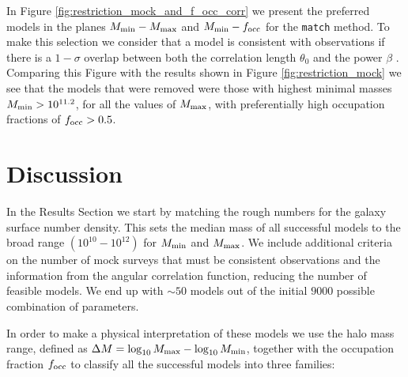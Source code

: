 \documentclass[usenatbib]{mn2e}
\newcommand{\hMsun}{{\ifmmode{h^{-1}{\rm
        {M_{\odot}}}}\else{$h^{-1}{\rm{M_{\odot}}}$}\fi}}
\begin{document}
In Figure \ref{fig:restriction_mock_and_f_occ_corr} we present the preferred
models in the planes $M_{\rm min}-M_{\rm  max}$ and $M_{\rm min}-f_{\rm occ}$
for the {\tt match} method. To make this selection we consider that
a model is consistent with observations if there is a $1-\sigma$
overlap between both the correlation length $\theta_0$ and the power
$\beta$ . Comparing this Figure with the results shown in Figure
\ref{fig:restriction_mock} we see that the models that were removed
were those with highest minimal masses $M_{\rm min}>10^{11.2}$, for
all the values of $M_{\rm max}$, with preferentially high
occupation fractions of $f_{\rm occ}> 0.5$.  
 








\section{Discussion}

In the Results Section we start by matching the rough numbers for the
galaxy surface number density. This sets the median mass of all
successful models to the broad range $(10^{10}-10^{12})$ \hMsun for
$M_{\rm min}$ and $M_{\rm max}$. We include additional criteria on the
number of mock surveys that must be consistent observations
and the information from the angular correlation function, reducing
the number of feasible models. We end up with $\sim 50$ models out of
the initial $9000$ possible combination of parameters. 

In order to make a physical interpretation of these models we use 
the halo mass range, defined as $\Delta M=\log_{10}M_{\rm max} -
\log_{10}M_{\rm  min}$, together with the occupation fraction $f_{\rm
  occ}$ to classify all the successful models into three families:  
\end{document}
